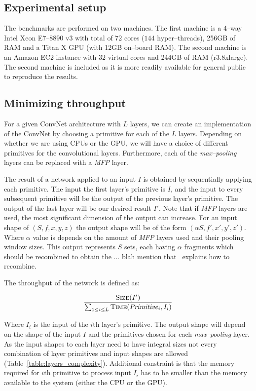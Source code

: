 \documentclass[conference]{IEEEtran}
\begin{document}
\subsection{Experimental setup}

  The benchmarks are performed on two machines.  The first machine is
  a 4--way Intel Xeon E7--8890 v3 with total of $72$ cores ($144$
  hyper--threads), 256GB of RAM and a Titan X GPU (with 12GB on--board
  RAM).  The second machine is an Amazon EC2 instance with $32$
  virtual cores and 244GB of RAM (r3.8xlarge).  The second machine is
  included as it is more readily available for general public to
  reproduce the results.

\subsection{Minimizing throughput}

  For a given ConvNet architecture with $L$ layers, we can create an
  implementation of the ConvNet by choosing a primitive for each of
  the $L$ layers.  Depending on whether we are using CPUs or the GPU,
  we will have a choice of different primitives for the convolutional
  layers.  Furthermore, each of the \emph{max--pooling} layers can be
  replaced with a \emph{MFP} layer.

  The result of a network applied to an input $I$ is obtained by
  sequentially applying each primitive.  The input the first layer's
  primitive is $I$, and the input to every subsequent primitive will
  be the output of the previous layer's primitive.  The output of the
  last layer will be our desired result $I'$.  Note that if \emph{MFP}
  layers are used, the most significant dimension of the output can
  increase.  For an input shape of $(S,f,x,y,z)$ the output shape will
  be of the form $(\alpha S,f',x',y',z')$.  Where $\alpha$ value is
  depends on the amount of \emph{MFP} layers used and their pooling
  window sizes.  This output represents $S$ sets, each having $\alpha$
  fragments which should be recombined to obtain the ... blah mention
  that~\cite{giusti2013fast,masci2013fast} explains how to recombine.

  The throughput of the network is defined as:

  $$\frac{\proc{Size}(I')}{\sum_{1 \le i \le L}
    \proc{Time}(\id{Primitive}_i,I_i)}$$

  Where $I_i$ is the input of the $i$th layer's primitive.  The output
  shape will depend on the shape of the input $I$ and the primitives
  chosen for each \emph{max--pooling} layer.  As the input shapes to
  each layer need to have integral sizes not every combination of
  layer primitives and input shapes are allowed
  (Table~\ref{table:layers_complexity}).  Additional constraint is
  that the memory required for $i$th primitive to process input $I_i$
  has to be smaller than the memory available to the system (either
  the CPU or the GPU).
\end{document}
